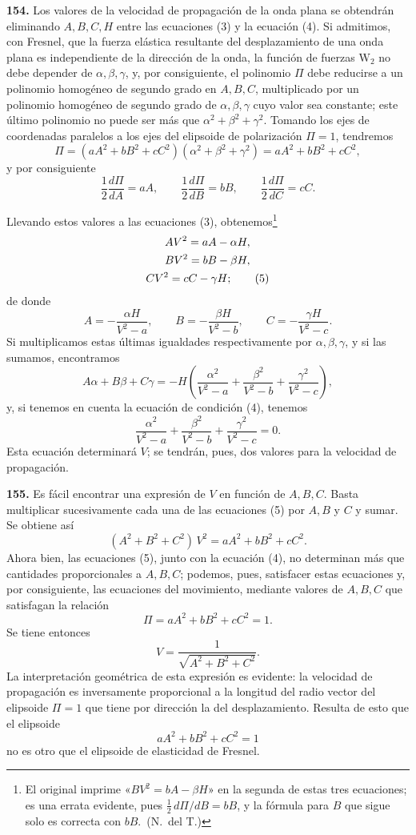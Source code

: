 \noindent\textbf{154.} Los valores de la velocidad de propagación de la
onda plana se obtendrán eliminando $A,B,C,H$ entre las ecuaciones (3) y la
ecuación (4). Si admitimos, con Fresnel, que la fuerza elástica resultante
del desplazamiento de una onda plana es independiente de la dirección de
la onda, la función de fuerzas $\mathrm{W}_2$ no debe depender de
$\alpha,\beta,\gamma$, y, por consiguiente, el polinomio $\Pi$ debe
reducirse a un polinomio homogéneo de segundo grado en $A,B,C$,
multiplicado por un polinomio homogéneo de segundo grado de
$\alpha,\beta,\gamma$ cuyo valor sea constante; este último polinomio no
puede ser más que $\alpha^2+\beta^2+\gamma^2$. Tomando los ejes de
coordenadas paralelos a los ejes del elipsoide de polarización $\Pi=1$,
tendremos
\[
\Pi=(aA^2+bB^2+cC^2)(\alpha^2+\beta^2+\gamma^2)=aA^2+bB^2+cC^2,
\]
y por consiguiente
\[
\frac{1}{2}\frac{d\Pi}{dA}=aA,\qquad \frac{1}{2}\frac{d\Pi}{dB}=bB,\qquad
\frac{1}{2}\frac{d\Pi}{dC}=cC.
\]

Llevando estos valores a las ecuaciones (3), obtenemos\footnote{El
original imprime «$BV^2=bA-\beta H$» en la segunda de estas tres
ecuaciones; es una errata evidente, pues $\frac12\,d\Pi/dB=bB$, y la
fórmula para $B$ que sigue solo es correcta con $bB$.~(N.~del T.)}
\begin{gather}
AV^2=aA-\alpha H,\notag\\
BV^2=bB-\beta H,\notag\\
CV^2=cC-\gamma H;
\tag{5}
\end{gather}
de donde
\[
A=-\frac{\alpha H}{V^2-a},\qquad B=-\frac{\beta H}{V^2-b},\qquad
C=-\frac{\gamma H}{V^2-c}.
\]
Si multiplicamos estas últimas igualdades respectivamente por
$\alpha,\beta,\gamma$, y si las sumamos, encontramos
\[
A\alpha+B\beta+C\gamma=-H\left(\frac{\alpha^2}{V^2-a}+\frac{\beta^2}{V^2-b}+\frac{\gamma^2}{V^2-c}\right),
\]
y, si tenemos en cuenta la ecuación de condición (4), tenemos
\[
\frac{\alpha^2}{V^2-a}+\frac{\beta^2}{V^2-b}+\frac{\gamma^2}{V^2-c}=0.
\]
Esta ecuación determinará $V$; se tendrán, pues, dos valores para la
velocidad de propagación.

\noindent\textbf{155.} Es fácil encontrar una expresión de $V$ en función de $A,B,C$. Basta
multiplicar sucesivamente cada una de las ecuaciones (5) por $A,B$ y $C$ y
sumar. Se obtiene así
\[
(A^2+B^2+C^2)\,V^2=aA^2+bB^2+cC^2.
\]
Ahora bien, las ecuaciones (5), junto con la ecuación (4), no determinan
más que cantidades proporcionales a $A,B,C$; podemos, pues, satisfacer
estas ecuaciones y, por consiguiente, las ecuaciones del movimiento,
mediante valores de $A,B,C$ que satisfagan la relación
\begin{equation}
\Pi=aA^2+bB^2+cC^2=1.
\tag{6}
\end{equation}
Se tiene entonces
\[
V=\frac{1}{\sqrt{A^2+B^2+C^2}}.
\]
La interpretación geométrica de esta expresión es evidente: la velocidad
de propagación es inversamente proporcional a la longitud del radio
vector del elipsoide $\Pi=1$ que tiene por dirección la del desplazamiento.
Resulta de esto que el elipsoide
\[
aA^2+bB^2+cC^2=1
\]
no es otro que el elipsoide de elasticidad de Fresnel.

